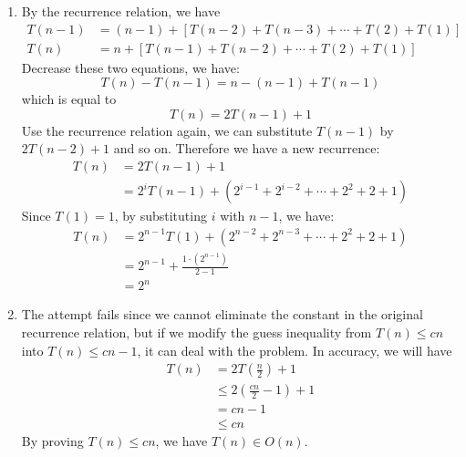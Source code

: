 \documentclass[a4paper,12pt]{article}
\begin{document}
\begin{enumerate}
\item {
By the recurrence relation, we have
\[
\begin{split}
    T(n-1) & = (n-1) + [T(n-2) + T(n-3) + \cdots + T(2) + T(1)] \\
    T(n) & = n + [T(n-1) + T(n-2) + \cdots + T(2) + T(1)]
\end{split}
\]
Decrease these two equations, we have:
\[
T(n)-T(n-1)=n-(n-1)+T(n-1)
\]
which is equal to
\[
T(n) = 2T(n-1)+1
\]
Use the recurrence relation again, we can substitute $T(n-1)$ by $2T(n-2)+1$ and so on. Therefore we have a new recurrence:
\[
\begin{split}
    T(n) & = 2T(n-1)+1 \\
    & = 2^iT(n-1) + (2^{i-1} + 2^{i-2} + \cdots + 2^2 + 2 + 1)
\end{split}
\]
Since $T(1) = 1$, by substituting $i$ with $n-1$, we have:
\[
\begin{split}
    T(n) & = 2^{n-1}T(1) + (2^{n-2} + 2^{n-3} + \cdots + 2^2 + 2 + 1) \\
    & = 2^{n-1} + \frac{1\cdot (2^{n-1})}{2-1} \\
    & = 2^n
\end{split}
\]

}

\item{
The attempt fails since we cannot eliminate the constant in the original recurrence relation, but if we modify the guess inequality from $T(n)\leq cn$ into $T(n) \leq cn - 1$, it can deal with the problem. In accuracy, we will have
\[
\begin{split}
    T(n) & = 2T(\frac{n}{2}) + 1 \\
    & \leq 2(\frac{cn}{2} - 1) + 1 \\
    & = cn - 1 \\
    & \leq cn
\end{split}
\]
By proving $T(n) \leq cn$, we have $T(n) \in O(n)$.
}


\end{enumerate}
\end{document}
